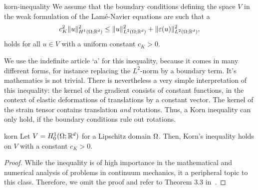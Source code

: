 \begin{Assumption}{korn-inequality}
  We assume that the boundary conditions defining the space $V$ in the
  weak formulation of the Lamé-Navier equations are such that
  a 
  \begin{gather}
    \label{eq:mixedintro:korn}
    c_K^2 \lVert u\rVert_{H^1(\Omega;\mathbb R^d)}^2
    \le \lVert u\rVert_{L^2(\Omega;\mathbb R^d)}^2
    + \lVert\varepsilon(u)\rVert_{L^2(\Omega;\mathbb R^d)}^2,
  \end{gather}
  holds for all $u\in V$ with a uniform constant $c_K>0$.
\end{Assumption}

\begin{remark}
  We use the indefinite article `a' for this inequality, because it
  comes in many different forms, for instance replacing the $L^2$-norm
  by a boundary term. It's mathematics is not trivial. There is
  nevertheless a very simple interpretation of this inequality: the
  kernel of the gradient consists of constant functions, in the
  context of elastic deformations of translations by a constant
  vector. The kernel of the strain tensor contains translation
  \emph{and} rotations. Thus, a Korn inequality can only hold, if the
  boundary conditions rule out rotations.
\end{remark}

\begin{Lemma}{korn}
  Let $V = H^1_0(\Omega;\mathbb R^d)$ for a Lipschitz domain
  $\Omega$. Then, Korn's inequality holds on $V$ with a constant
  $c_K>0$.
\end{Lemma}

\begin{proof}
  While the inequality is of high importance in the mathematical
  and numerical analysis of problems in continuum mechanics, it a
  peripheral topic to this class. Therefore, we omit the proof and
  refer to Theorem 3.3 in~\cite[Section III.3.3]{DuvautLions76}.
\end{proof}

